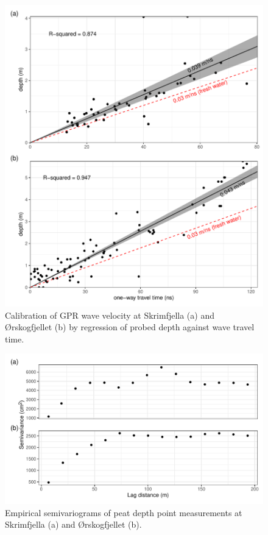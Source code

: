 \documentclass[soil, manuscript]{copernicus}
\providecommand{\DIFaddbegin}{} %
\providecommand{\DIFdelbegin}{} %
\providecommand{\DIFaddbeginFL}{} %
\providecommand{\DIFaddendFL}{} %
\providecommand{\DIFdelbeginFL}{} %
\providecommand{\DIFdelendFL}{} %
\begin{document}
\begin{figure}[ht]
\DIFaddendFL \centering
\DIFdelbeginFL %
\DIFdelendFL \DIFaddbeginFL \includegraphics[height=0.7\textheight]{figures/GPRwavevelocity.pdf}
\DIFaddendFL \caption{\label{fig:GPRwavevelocity}Calibration of GPR wave velocity at Skrimfjella (a) and Ørskogfjellet (b) by regression of probed depth against wave travel time.}
\end{figure}
\DIFdelbegin %
\DIFdelendFL \DIFaddbeginFL 

\begin{figure}[ht]
\DIFaddendFL \centering
\includegraphics{figures/semivariograms.pdf}
\caption{\label{fig:semivariograms}Empirical semivariograms of peat depth point measurements at Skrimfjella (a) and Ørskogfjellet (b).}
\end{figure}
\DIFaddbegin \clearpage
\end{document}
